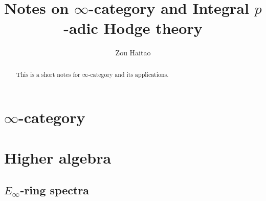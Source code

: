 \documentclass[a4paper,11pt]{article}
\title{Notes on $\infty$-category and Integral $p$-adic Hodge theory}
\author{Zou Haitao}
\date{}
\begin{document}
\maketitle
\begin{abstract}
	This is a short notes for $\infty$-category and its applications.
\end{abstract}
\tableofcontents
\section{$\infty$-category}
  
\section{Higher algebra}
\subsection{$E_\infty$-ring spectra}

\newpage


\end{document}
